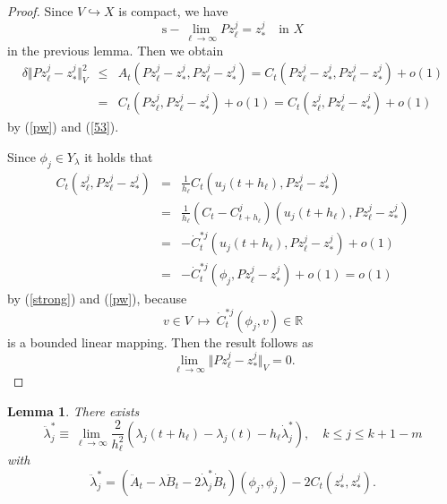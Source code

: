 \documentclass[final,a4paper]{jmsj}
\newcommand{\R}{\mathbb R}
\theoremstyle{thmstyleone}%
\theoremstyle{thmstyletwo}%
\theoremstyle{thmstylethree}%
\newtheorem{lemma}[theorem]{Lemma}
\begin{document}
\begin{proof} 
Since $V\hookrightarrow X$ is compact, we have  
\begin{equation} 
\mbox{s}-\lim_{\ell\rightarrow\infty} Pz_{\ell}^j=z_\ast^j \quad \mbox{in $X$}  
 \label{53}
\end{equation} 
in the previous lemma. Then we obtain 
\begin{eqnarray*} 
\delta \Vert Pz_{\ell}^j-z_\ast^j\Vert_V^2 & \leq & A_t(Pz_{\ell}^j-z_\ast^j, Pz_{\ell}^j-z_\ast^j)= C_t(Pz_{\ell}^j-z_\ast^j, Pz_{\ell}^j-z_\ast^j)+o(1) \\ 
& = & C_t(Pz_{\ell}^j, Pz_{\ell}^j-z_\ast^j)+o(1) =C_t(z_{\ell}^j, Pz_{\ell}^j-z_\ast^j)+o(1)  
\end{eqnarray*} 
by (\ref{pw}) and (\ref{53}). 

Since $\phi_j\in Y_\lambda$ it holds that  
\begin{eqnarray*} 
C_t(z_{\ell}^j, Pz_{\ell}^j-z_\ast^j) & = & \frac{1}{h_\ell}C_t(u_j(t+h_\ell), Pz_{\ell}^j-z_\ast^j) \\
& = & \frac{1}{h_\ell}(C_t-C_{t+h_\ell}^j)(u_j(t+h_\ell), Pz_{\ell}^j-z_\ast^j) \\ 
& = & -\dot C_{t}^{\ast j}(u_j(t+h_\ell), Pz_{\ell}^j-z_\ast^j)+o(1)  \\ 
& = &  -\dot C_{t}^{\ast j}(\phi_j, Pz_{\ell}^j-z_\ast^j)+o(1)=o(1) 
\end{eqnarray*} 
by (\ref{strong}) and (\ref{pw}), because 
\[ v\in V \ \mapsto \ \dot C_{t}^{\ast j}(\phi_j, v)\in \R \] 
is a bounded linear mapping. Then the result follows as 
\[ \lim_{\ell\rightarrow \infty}\Vert Pz_\ell^j-z_\ast^j\Vert_V=0. \]  
\end{proof} 

\begin{lemma}\label{lem12} 
There exists 
\begin{equation} 
\ddot \lambda_j^\ast\equiv \lim_{\ell\rightarrow \infty}\frac{2}{h_\ell^2}(\lambda_j(t+h_\ell)-\lambda_j(t)-h_\ell\dot\lambda_j^\ast), \quad 
k\leq j\leq k+1-m 
 \label{h2}
\end{equation} 
with 
\[ \ddot \lambda_j^\ast =(\ddot A_t-\lambda \ddot B_t-2\dot \lambda_j^\ast\dot B_t)(\phi_j, \phi_j)-2C_t(z_\ast^j, z_\ast^j).  \] 
\end{lemma} 
\end{document}

